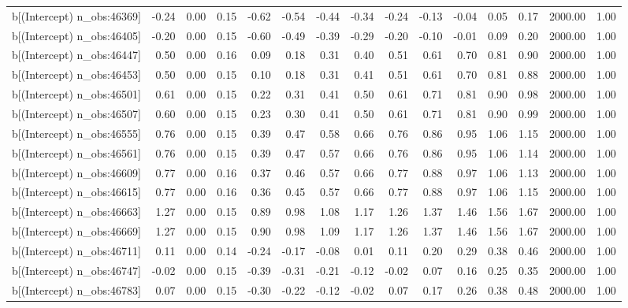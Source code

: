 \begin{table}[ht]
\begin{tabular}{rrrrrrrrrrrrrrr}
  b[(Intercept) n\_obs:46369] & -0.24 & 0.00 & 0.15 & -0.62 & -0.54 & -0.44 & -0.34 & -0.24 & -0.13 & -0.04 & 0.05 & 0.17 & 2000.00 & 1.00 \\ 
  b[(Intercept) n\_obs:46405] & -0.20 & 0.00 & 0.15 & -0.60 & -0.49 & -0.39 & -0.29 & -0.20 & -0.10 & -0.01 & 0.09 & 0.20 & 2000.00 & 1.00 \\ 
  b[(Intercept) n\_obs:46447] & 0.50 & 0.00 & 0.16 & 0.09 & 0.18 & 0.31 & 0.40 & 0.51 & 0.61 & 0.70 & 0.81 & 0.90 & 2000.00 & 1.00 \\ 
  b[(Intercept) n\_obs:46453] & 0.50 & 0.00 & 0.15 & 0.10 & 0.18 & 0.31 & 0.41 & 0.51 & 0.61 & 0.70 & 0.81 & 0.88 & 2000.00 & 1.00 \\ 
  b[(Intercept) n\_obs:46501] & 0.61 & 0.00 & 0.15 & 0.22 & 0.31 & 0.41 & 0.50 & 0.61 & 0.71 & 0.81 & 0.90 & 0.98 & 2000.00 & 1.00 \\ 
  b[(Intercept) n\_obs:46507] & 0.60 & 0.00 & 0.15 & 0.23 & 0.30 & 0.41 & 0.50 & 0.61 & 0.71 & 0.81 & 0.90 & 0.99 & 2000.00 & 1.00 \\ 
  b[(Intercept) n\_obs:46555] & 0.76 & 0.00 & 0.15 & 0.39 & 0.47 & 0.58 & 0.66 & 0.76 & 0.86 & 0.95 & 1.06 & 1.15 & 2000.00 & 1.00 \\ 
  b[(Intercept) n\_obs:46561] & 0.76 & 0.00 & 0.15 & 0.39 & 0.47 & 0.57 & 0.66 & 0.76 & 0.86 & 0.95 & 1.06 & 1.14 & 2000.00 & 1.00 \\ 
  b[(Intercept) n\_obs:46609] & 0.77 & 0.00 & 0.16 & 0.37 & 0.46 & 0.57 & 0.66 & 0.77 & 0.88 & 0.97 & 1.06 & 1.13 & 2000.00 & 1.00 \\ 
  b[(Intercept) n\_obs:46615] & 0.77 & 0.00 & 0.16 & 0.36 & 0.45 & 0.57 & 0.66 & 0.77 & 0.88 & 0.97 & 1.06 & 1.15 & 2000.00 & 1.00 \\ 
  b[(Intercept) n\_obs:46663] & 1.27 & 0.00 & 0.15 & 0.89 & 0.98 & 1.08 & 1.17 & 1.26 & 1.37 & 1.46 & 1.56 & 1.67 & 2000.00 & 1.00 \\ 
  b[(Intercept) n\_obs:46669] & 1.27 & 0.00 & 0.15 & 0.90 & 0.98 & 1.09 & 1.17 & 1.26 & 1.37 & 1.46 & 1.56 & 1.67 & 2000.00 & 1.00 \\ 
  b[(Intercept) n\_obs:46711] & 0.11 & 0.00 & 0.14 & -0.24 & -0.17 & -0.08 & 0.01 & 0.11 & 0.20 & 0.29 & 0.38 & 0.46 & 2000.00 & 1.00 \\ 
  b[(Intercept) n\_obs:46747] & -0.02 & 0.00 & 0.15 & -0.39 & -0.31 & -0.21 & -0.12 & -0.02 & 0.07 & 0.16 & 0.25 & 0.35 & 2000.00 & 1.00 \\ 
  b[(Intercept) n\_obs:46783] & 0.07 & 0.00 & 0.15 & -0.30 & -0.22 & -0.12 & -0.02 & 0.07 & 0.17 & 0.26 & 0.38 & 0.48 & 2000.00 & 1.00 \\ 

\end{tabular}
\end{table}
